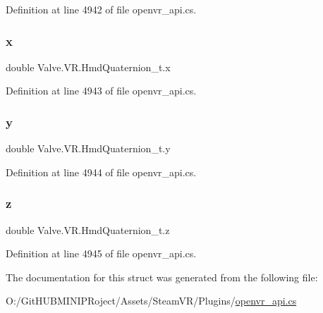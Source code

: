Definition at line 4942 of file openvr\+\_\+api.\+cs.

\mbox{\label{struct_valve_1_1_v_r_1_1_hmd_quaternion__t_abe6f358b7f19defef34ee6fa452d5c2b}} 
\subsubsection{\texorpdfstring{x}{x}}
{\footnotesize\ttfamily double Valve.\+V\+R.\+Hmd\+Quaternion\+\_\+t.\+x}



Definition at line 4943 of file openvr\+\_\+api.\+cs.

\mbox{\label{struct_valve_1_1_v_r_1_1_hmd_quaternion__t_a1c9ceb112eb4ca504f5218065ae142fe}} 
\subsubsection{\texorpdfstring{y}{y}}
{\footnotesize\ttfamily double Valve.\+V\+R.\+Hmd\+Quaternion\+\_\+t.\+y}



Definition at line 4944 of file openvr\+\_\+api.\+cs.

\mbox{\label{struct_valve_1_1_v_r_1_1_hmd_quaternion__t_af414f9d15465669e77fa015630832a52}} 
\subsubsection{\texorpdfstring{z}{z}}
{\footnotesize\ttfamily double Valve.\+V\+R.\+Hmd\+Quaternion\+\_\+t.\+z}



Definition at line 4945 of file openvr\+\_\+api.\+cs.



The documentation for this struct was generated from the following file\+:\begin{DoxyCompactItemize}
\item 
O\+:/\+Git\+H\+U\+B\+M\+I\+N\+I\+P\+Roject/\+Assets/\+Steam\+V\+R/\+Plugins/\mbox{\hyperlink{openvr__api_8cs}{openvr\+\_\+api.\+cs}}\end{DoxyCompactItemize}
